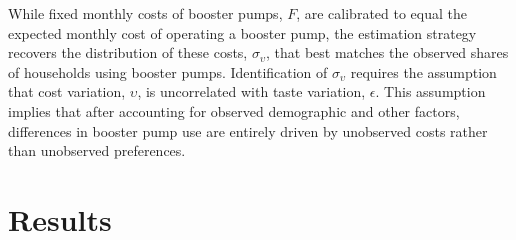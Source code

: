 \documentclass[12pt,table]{article}
\begin{document}
While fixed monthly costs of booster pumps, $F$, are calibrated to equal the expected monthly cost of operating a booster pump, the estimation strategy recovers the distribution of these costs, $\sigma_{\upsilon}$, that best matches the observed shares of households using booster pumps.  Identification of $\sigma_{\upsilon}$ requires the assumption that cost variation, $\upsilon$, is uncorrelated with taste variation, $\epsilon$.  This assumption implies that after accounting for observed demographic and other factors, differences in booster pump use are entirely driven by unobserved costs rather than unobserved preferences.



\section{Results}
\end{document}
